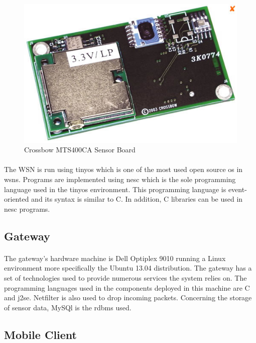 \documentclass[oneside,12pt,a4paper,final]{book}
\begin{document}
\begin{figure}[htbp]
\centering
\includegraphics[scale=0.5]{img/mts400ca.jpg}
\caption{Crossbow MTS400CA Sensor Board}
\label{fig:mts400}
\end{figure}
\paragraph{}
The WSN is run using \gls{tinyos} which is one of the most used open source \gls{os} in \glspl{wsn}. Programs are implemented using \gls{nesc} which is the sole programming language used in the \gls{tinyos} environment. This programming language is event-oriented and its syntax is similar to C. In addition, C libraries can be used in \gls{nesc} programs.

\subsection{Gateway}
\paragraph{}
The gateway's hardware machine is Dell Optiplex 9010 running a Linux environment more specifically the Ubuntu 13.04 distribution. The gateway has a set of technologies used to provide numerous services the system relies on. The programming languages used in the components deployed in this machine are C and \gls{j2se}. Netfilter is also used to drop incoming packets. Concerning the storage of sensor data, MySQl is the \gls{rdbms} used.

\subsection{Mobile Client}
\end{document}
